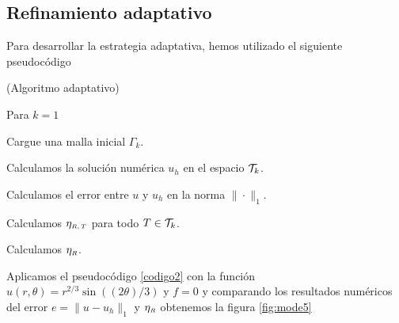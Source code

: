 \subsection{Refinamiento adaptativo}
Para desarrollar la estrategia adaptativa, hemos utilizado el siguiente pseudoc\'odigo 

\begin{algorithm}[H]\label{codigo2}
	\caption{ (Algoritmo adaptativo) }
	\SetAlgoLined
	\LinesNumbered
	\SetAlgoVlined
	Para $k=1$ 
	
	Cargue una malla inicial $\Gamma_{k}$.
	
	Calculamos la soluci\'on num\'erica $u_{h}$ en el espacio ${\mathcal{T}}_{k}$.
	
	Calculamos el error entre $u$ y $u_{h}$  en la norma $\| \cdot\|_{1}$.
	
	Calculamos $\eta_{\text{\tiny $R,T$}}$ para todo $T\in {\ensuremath{\mathcal{T}}}_{k}$.
	
	Calculamos $\eta_{\text{\tiny     $R$}}$.
	
\end{algorithm}

Aplicamos el pseudoc\'odigo \ref{codigo2} con la funci\'on $u(r,\theta)=r^{2/3}\sin((2\theta)/3) \text{ y } f=0 $ y comparando los resultados num\'ericos del error $e=\|u-u_{h}\|_{1}$ y $\eta_{\text{\tiny $R$}}$ obtenemos la figura \ref{fig:mode5}


